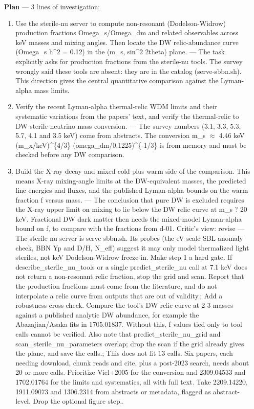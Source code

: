 \documentclass[11pt,a4paper]{article}
\begin{document}
\textbf{Plan} --- 3 lines of investigation:

\begin{enumerate}
  \item Use the sterile-nu server to compute non-resonant (Dodelson-Widrow) production fractions Omega\_s/Omega\_dm and related observables across keV masses and mixing angles. Then locate the DW relic-abundance curve (Omega\_s h\textasciicircum{}2 = 0.12) in the (m\_s, sin\textasciicircum{}2 2theta) plane. --- The task explicitly asks for production fractions from the sterile-nu tools. The survey wrongly said these tools are absent: they are in the catalog (serve-sbbn.sh). This direction gives the central quantitative comparison against the Lyman-alpha mass limits.
  \item Verify the recent Lyman-alpha thermal-relic WDM limits and their systematic variations from the papers' text, and verify the thermal-relic to DW sterile-neutrino mass conversion. --- The survey numbers (3.1, 3.3, 5.3, 5.7, 4.1 and 3.5 keV) come from abstracts. The conversion m\_s $\approx$ 4.46 keV (m\_x/keV)\textasciicircum{}\{4/3\} (omega\_dm/0.1225)\textasciicircum{}\{-1/3\} is from memory and must be checked before any DW comparison.
  \item Build the X-ray decay and mixed cold-plus-warm side of the comparison. This means X-ray mixing-angle limits at the DW-equivalent masses, the predicted line energies and fluxes, and the published Lyman-alpha bounds on the warm fraction f versus mass. --- The conclusion that pure DW is excluded requires the X-ray upper limit on mixing to lie below the DW relic curve at m\_s ? 20 keV. Fractional DW dark matter then needs the mixed-model Lyman-alpha bound on f, to compare with the fractions from d-01.
Critic's view: revise --- The sterile-nu server is serve-sbbn.sh. Its probes (the eV-scale SBL anomaly check, BBN Yp and D/H, N\_eff) suggest it may only model thermalized light steriles, not keV Dodelson-Widrow freeze-in. Make step 1 a hard gate. If describe\_sterile\_nu\_tools or a single predict\_sterile\_nu call at 7.1 keV does not return a non-resonant relic fraction, stop the grid and scan. Report that the production fractions must come from the literature, and do not interpolate a relic curve from outputs that are out of validity.; Add a robustness cross-check. Compare the tool's DW relic curve at 2-3 masses against a published analytic DW abundance, for example the Abazajian/Asaka fits in 1705.01837. Without this, f values tied only to tool calls cannot be verified. Also note that predict\_sterile\_nu\_grid and scan\_sterile\_nu\_parameters overlap; drop the scan if the grid already gives the plane, and save the calls.; This does not fit 13 calls. Six papers, each needing download, chunk reads and cite, plus a post-2023 search, needs about 20 or more calls. Prioritize Viel+2005 for the conversion and 2309.04533 and 1702.01764 for the limits and systematics, all with full text. Take 2209.14220, 1911.09073 and 1306.2314 from abstracts or metadata, flagged as abstract-level. Drop the optional figure step..

\end{enumerate}
\end{document}
